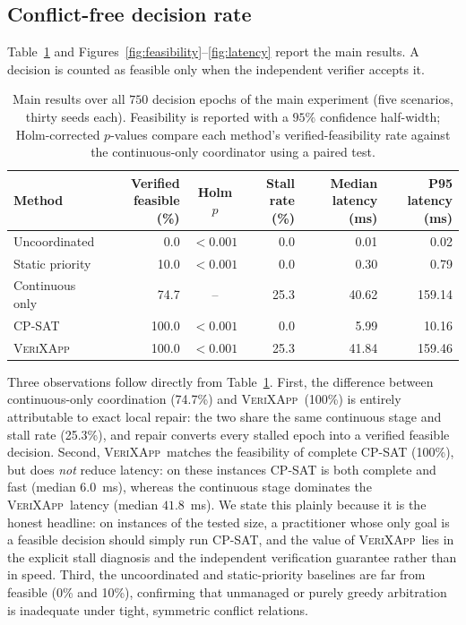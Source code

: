 \documentclass[pdflatex,sn-mathphys-num,iicol,oneside]{sn-jnl}
\newcommand{\method}{\textsc{VeriXApp}}
\begin{document}
\subsection{Conflict-free decision rate}

Table~\ref{tab:main-results} and
Figures~\ref{fig:feasibility}--\ref{fig:latency} report the main
results. A decision is counted as feasible only when the independent
verifier accepts it.

\begin{table}[t]
\centering
\caption{
Main results over all $750$ decision epochs of the main experiment
(five scenarios, thirty seeds each). Feasibility is reported with a
$95\%$ confidence half-width; Holm-corrected $p$-values compare each
method's verified-feasibility rate against the continuous-only
coordinator using a paired test.
}
\label{tab:main-results}
\begin{tabular}{
l
r
c
r
r
r
}
\toprule
Method &
{Verified feasible (\%)} &
{Holm $p$} &
{Stall rate (\%)} &
{Median latency (ms)} &
{P95 latency (ms)}\\
\midrule
Uncoordinated &
{0.0} &
{$<0.001$} &
{0.0} &
{0.01} &
{0.02}\\

Static priority &
{10.0} &
{$<0.001$} &
{0.0} &
{0.30} &
{0.79}\\

Continuous only &
{74.7} &
{--} &
{25.3} &
{40.62} &
{159.14}\\

CP-SAT &
{100.0} &
{$<0.001$} &
{0.0} &
{5.99} &
{10.16}\\

\method &
{100.0} &
{$<0.001$} &
{25.3} &
{41.84} &
{159.46}\\

\bottomrule
\end{tabular}
\end{table}

Three observations follow directly from
Table~\ref{tab:main-results}. First, the difference between
continuous-only coordination (74.7\%) and \method\ (100\%) is
entirely attributable to exact local repair: the two share the same
continuous stage and stall rate (25.3\%), and repair converts every
stalled epoch into a verified feasible decision. Second, \method\
matches the feasibility of complete CP-SAT (100\%), but does
\emph{not} reduce latency: on these instances CP-SAT is both complete
and fast (median $6.0$~ms), whereas the continuous stage dominates the
\method\ latency (median $41.8$~ms). We state this plainly because it
is the honest headline: on instances of the tested size, a
practitioner whose only goal is a feasible decision should simply run
CP-SAT, and the value of \method\ lies in the explicit stall
diagnosis and the independent verification guarantee rather than in
speed. Third, the uncoordinated and static-priority baselines are far
from feasible (0\% and 10\%), confirming that unmanaged or purely
greedy arbitration is inadequate under tight, symmetric conflict
relations.
\end{document}
